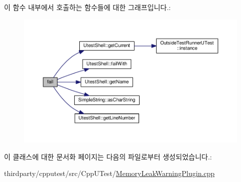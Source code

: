이 함수 내부에서 호출하는 함수들에 대한 그래프입니다.\+:
\nopagebreak
\begin{figure}[H]
\begin{center}
\leavevmode
\includegraphics[width=350pt]{class_memory_leak_warning_reporter_ab0c95182b8a5af802640f434a32f1943_cgraph}
\end{center}
\end{figure}




이 클래스에 대한 문서화 페이지는 다음의 파일로부터 생성되었습니다.\+:\begin{DoxyCompactItemize}
\item 
thirdparty/cpputest/src/\+Cpp\+U\+Test/\hyperlink{_memory_leak_warning_plugin_8cpp}{Memory\+Leak\+Warning\+Plugin.\+cpp}\end{DoxyCompactItemize}

